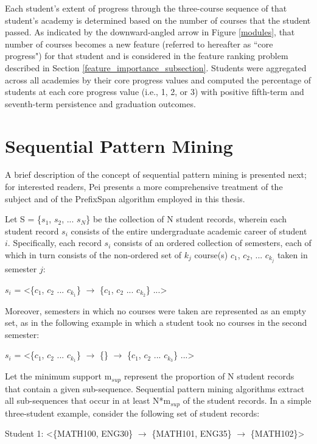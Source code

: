 Each student's extent of progress through the three-course sequence of that student's academy is determined based on the number of courses that the student passed.  As indicated by the downward-angled arrow in Figure \ref{modules}, that number of courses becomes a new feature (referred to hereafter as ``core progress") for that student and is considered in the feature ranking problem described in Section \ref{feature_importance_subsection}.  Students were aggregated across all academies by their core progress values and computed the percentage of students at each core progress value (i.e., 1, 2, or 3) with positive fifth-term and seventh-term persistence and graduation outcomes.


\section{Sequential Pattern Mining}
\label{methods_section_spm}

A brief description of the concept of sequential pattern mining is presented next; for interested readers, Pei \cite{Pei} presents a more comprehensive treatment of the subject and of the PrefixSpan algorithm employed in this thesis.

Let S = \{$s_1$, $s_2$, ... $s_N$\} be the collection of N student records, wherein each student record $s_i$ consists of the entire undergraduate academic career of student $i$.  Specifically, each record $s_i$ consists of an ordered collection of semesters, each of which in turn consists of the non-ordered set of $k_j$ course(s) $c_1$, $c_2$, ... $c_{k_j}$  taken in semester $j$: 

$s_i$ = \textless\{$c_1$, $c_2$ ... $c_{k_1}$\}  $\rightarrow$ \{$c_1$, $c_2$ ... $c_{k_2}$\} ...\textgreater  

Moreover, semesters in which no courses were taken are represented as an empty set, as in the following example in which a student took no courses in the second semester:

$s_i$ = \textless\{$c_1$, $c_2$ ... $c_{k_1}$\} $\rightarrow$ \{\} $\rightarrow$ \{$c_1$, $c_2$ ... $c_{k_3}$\} ...\textgreater

Let the minimum support m$_{sup}$ represent the proportion of N student records that contain a given sub-sequence.  Sequential pattern mining algorithms extract all sub-sequences that occur in at least N*m$_{sup}$ of the student records.  In a simple three-student example, consider the following set of student records:

Student 1: \textless\{MATH100, ENG30\} $\rightarrow$ \{MATH101, ENG35\} $\rightarrow$ \{MATH102\}\textgreater

